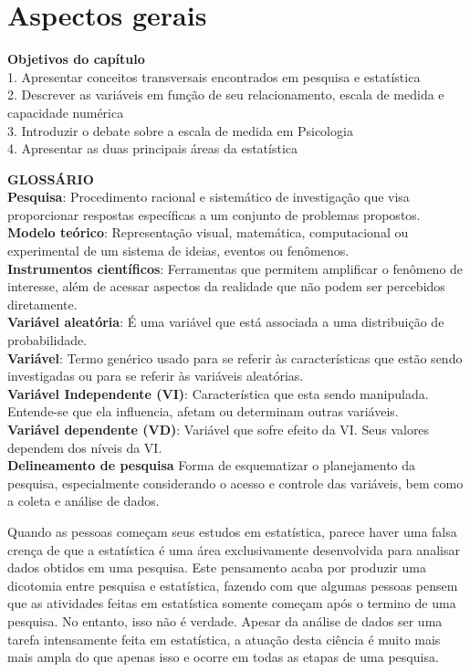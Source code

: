 \documentclass[
]{book}
\begin{document}
\hypertarget{aspectos-gerais}{%
\chapter{Aspectos gerais}\label{aspectos-gerais}}

\begin{objectives}
\textbf{Objetivos do capítulo}\\
1. Apresentar conceitos transversais encontrados em pesquisa e
estatística\\
2. Descrever as variáveis em função de seu relacionamento, escala de
medida e capacidade numérica\\
3. Introduzir o debate sobre a escala de medida em Psicologia\\
4. Apresentar as duas principais áreas da estatística
\end{objectives}

\begin{glossario}
\textbf{GLOSSÁRIO}\\
\textbf{Pesquisa}: Procedimento racional e sistemático de investigação
que visa proporcionar respostas específicas a um conjunto de problemas
propostos.\\
\textbf{Modelo teórico}: Representação visual, matemática, computacional
ou experimental de um sistema de ideias, eventos ou fenômenos.\\
\textbf{Instrumentos científicos}: Ferramentas que permitem amplificar o
fenômeno de interesse, além de acessar aspectos da realidade que não
podem ser percebidos diretamente.\\
\textbf{Variável aleatória}: É uma variável que está associada a uma
distribuição de probabilidade.\\
\textbf{Variável}: Termo genérico usado para se referir às
características que estão sendo investigadas ou para se referir às
variáveis aleatórias.\\
\textbf{Variável Independente (VI)}: Característica que esta sendo
manipulada. Entende-se que ela influencia, afetam ou determinam outras
variáveis.\\
\textbf{Variável dependente (VD)}: Variável que sofre efeito da VI. Seus
valores dependem dos níveis da VI.\\
\textbf{Delineamento de pesquisa} Forma de esquematizar o planejamento
da pesquisa, especialmente considerando o acesso e controle das
variáveis, bem como a coleta e análise de dados.
\end{glossario}

Quando as pessoas começam seus estudos em estatística, parece haver uma
falsa crença de que a estatística é uma área exclusivamente desenvolvida
para analisar dados obtidos em uma pesquisa. Este pensamento acaba por
produzir uma dicotomia entre pesquisa e estatística, fazendo com que
algumas pessoas pensem que as atividades feitas em estatística somente
começam após o termino de uma pesquisa. No entanto, isso não é verdade.
Apesar da análise de dados ser uma tarefa intensamente feita em
estatística, a atuação desta ciência é muito mais mais ampla do que
apenas isso e ocorre em todas as etapas de uma pesquisa.
\end{document}
